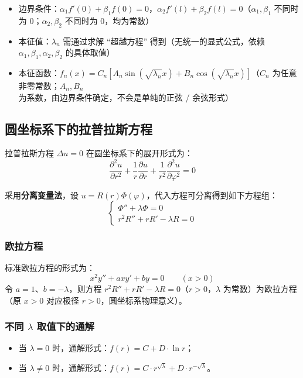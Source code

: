 \documentclass{article}
\begin{document}
	\begin{itemize}
		\item 边界条件：$ \alpha_1 f'(0) + \beta_1 f(0) = 0 $，$ \alpha_2 f'(l) + \beta_2 f(l) = 0 $（$ \alpha_1, \beta_1 $ 不同时为 0；$ \alpha_2, \beta_2 $ 不同时为 0，均为常数）
		\item 本征值：$ \lambda_n $ 需通过求解 “超越方程” 得到（无统一的显式公式，依赖 $ \alpha_1, \beta_1, \alpha_2, \beta_2 $ 的具体取值）
		\item 本征函数：$ f_n(x) = C_n \left[ A_n \sin\left( \sqrt{\lambda_n} x \right) + B_n \cos\left( \sqrt{\lambda_n} x \right) \right] $（$ C_n $ 为任意非零常数；$ A_n, B_n $ 为系数，由边界条件确定，不会是单纯的正弦 / 余弦形式）
	\end{itemize}
	
	\subsection{圆坐标系下的拉普拉斯方程}
	
	拉普拉斯方程 $\Delta u = 0$ 在圆坐标系下的展开形式为：
	\[
	\frac{\partial^2 u}{\partial r^2}+\frac{1}{r}\frac{\partial u}{\partial r}+\frac{1}{r^2}\frac{\partial^2 u}{\partial \varphi^2}=0
	\]
	
	采用\textbf{分离变量法}，设 $u = R(r)\Phi(\varphi)$，代入方程可分离得到如下方程组：
	\[
	\begin{cases}
		\Phi''+\lambda\Phi=0 \\
		r^2 R''+r R'-\lambda R=0
	\end{cases}
	\]
	
	\subsubsection{欧拉方程}
	标准欧拉方程的形式为：
	\[
	x^2 y'' + a x y' + b y = 0 \qquad (x>0)
	\]
	令 $a=1$、$b=-\lambda$，则方程 $ r^2 R''+r R'-\lambda R=0 $（$ r > 0 $，$ \lambda $ 为常数）为欧拉方程（原 $x>0$ 对应极径 $r>0$，圆坐标系物理意义）。
	
	\subsubsection{不同 $\lambda$ 取值下的通解}
	\begin{itemize}[leftmargin=2em, itemsep=0.5em]
		\item 当 $\lambda = 0$ 时，通解形式：$ f(r) = C + D \cdot \ln r $；
		\item 当 $\lambda \neq 0$ 时，通解形式：$ f(r) = C \cdot r^{\sqrt{\lambda}} + D \cdot r^{-\sqrt{\lambda}} $。
	\end{itemize}
	
\end{document}
